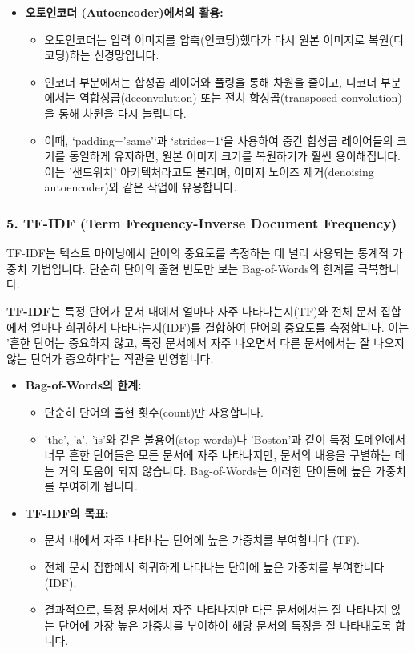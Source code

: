 \documentclass[11pt,a4paper]{article}
\begin{document}
\begin{itemize}
\begin{itemize}
    \end{itemize}
    \item \textbf{오토인코더 (Autoencoder)에서의 활용:}
    \begin{itemize}
        \item 오토인코더는 입력 이미지를 압축(인코딩)했다가 다시 원본 이미지로 복원(디코딩)하는 신경망입니다.
        \item 인코더 부분에서는 합성곱 레이어와 풀링을 통해 차원을 줄이고, 디코더 부분에서는 역합성곱(deconvolution) 또는 전치 합성곱(transposed convolution)을 통해 차원을 다시 늘립니다.
        \item 이때, `padding='same'`과 `strides=1`을 사용하여 중간 합성곱 레이어들의 크기를 동일하게 유지하면, 원본 이미지 크기를 복원하기가 훨씬 용이해집니다. 이는 '샌드위치' 아키텍처라고도 불리며, 이미지 노이즈 제거(denoising autoencoder)와 같은 작업에 유용합니다.
    \end{itemize}
\end{itemize}

\newpage
\subsubsection*{5. TF-IDF (Term Frequency-Inverse Document Frequency)}
TF-IDF는 텍스트 마이닝에서 단어의 중요도를 측정하는 데 널리 사용되는 통계적 가중치 기법입니다. 단순히 단어의 출현 빈도만 보는 Bag-of-Words의 한계를 극복합니다.

\begin{tcolorbox}[mybox, title=TF-IDF의 개념 및 필요성]
\textbf{TF-IDF}는 특정 단어가 문서 내에서 얼마나 자주 나타나는지(TF)와 전체 문서 집합에서 얼마나 희귀하게 나타나는지(IDF)를 결합하여 단어의 중요도를 측정합니다.
이는 '흔한 단어는 중요하지 않고, 특정 문서에서 자주 나오면서 다른 문서에서는 잘 나오지 않는 단어가 중요하다'는 직관을 반영합니다.
\end{tcolorbox}

\begin{itemize}
    \item \textbf{Bag-of-Words의 한계:}
    \begin{itemize}
        \item 단순히 단어의 출현 횟수(count)만 사용합니다.
        \item 'the', 'a', 'is'와 같은 불용어(stop words)나 'Boston'과 같이 특정 도메인에서 너무 흔한 단어들은 모든 문서에 자주 나타나지만, 문서의 내용을 구별하는 데는 거의 도움이 되지 않습니다. Bag-of-Words는 이러한 단어들에 높은 가중치를 부여하게 됩니다.
    \end{itemize}
    \item \textbf{TF-IDF의 목표:}
    \begin{itemize}
        \item 문서 내에서 자주 나타나는 단어에 높은 가중치를 부여합니다 (TF).
        \item 전체 문서 집합에서 희귀하게 나타나는 단어에 높은 가중치를 부여합니다 (IDF).
        \item 결과적으로, 특정 문서에서 자주 나타나지만 다른 문서에서는 잘 나타나지 않는 단어에 가장 높은 가중치를 부여하여 해당 문서의 특징을 잘 나타내도록 합니다.
    \end{itemize}
\end{itemize}
\end{document}
